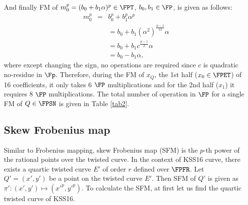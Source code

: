  And finally FM of $m_0^p = (b_0+b_1 \alpha)^p \in \FPT$, $b_0,b_1 \in \FP$, is given as follows:
\begin{eqnarray}
m_0^p  & = & b_0^p+b_1^p \alpha^p \nonumber \\
&& = b_0 + b_1 (\alpha^2)^{\frac{p-1}{12}} \alpha\nonumber \\
& & =  b_0 + b_1 c^{\frac{p-1}{2}} \alpha\nonumber \\
 & & = b_0 - b_1\alpha, \nonumber
\end{eqnarray}
where except changing the sign, no operations are required since $c$ is quadratic no-residue in $\Fp$. Therefore, during the FM of $x_Q$, the 1st half ($x_0 \in \FPET$) of 16 coefficients, it only takes 6 $\FP$ multiplications and for the 2nd half ($x_1$) it requires 8 $\FP$ multiplications. The total number of operation in $\FP$ for a single FM of  $Q \in \FPSN$ is given in Table \ref{tab2}.

\subsection{Skew Frobenius map}
Similar to Frobenius mapping, skew Frobenius map (SFM) is the $p$-th power of the rational points over the twisted curve. In the context of KSS16 curve, there exists a quartic twisted curve $E'$ of order $r$ defined over $\FPFR$. Let  $Q' = (x',y')$ be a point on the twisted curve $E'$. Then SFM of $Q'$ is given as $ \pi' : (x',y') \mapsto  (x'^p,y'^p)$.
To calculate the SFM, at first let us find the quartic twisted curve of KSS16.

